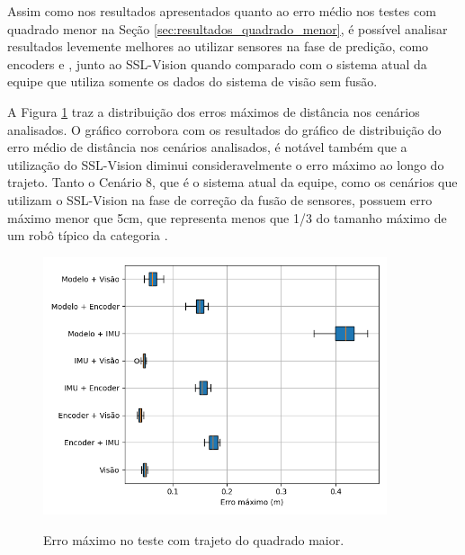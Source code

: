 \documentclass[acronym, symbols, table]{fei}
\begin{document}
		Assim como nos resultados apresentados quanto ao erro médio nos testes com quadrado menor na Seção \ref{sec:resultados_quadrado_menor}, é possível analisar resultados levemente melhores ao utilizar sensores na fase de predição, como encoders e , junto ao SSL-Vision quando comparado com o sistema atual da equipe que utiliza somente os dados do sistema de visão sem fusão.
	
		A Figura \ref{fig:erro_maximo_distancia_quad_maior} traz a distribuição dos erros máximos de distância nos cenários analisados. O gráfico corrobora com os resultados do gráfico de distribuição do erro médio de distância nos cenários analisados, é notável também que a utilização do SSL-Vision diminui consideravelmente o erro máximo ao longo do trajeto. Tanto o Cenário 8, que é o sistema atual da equipe, como os cenários que utilizam o SSL-Vision na fase de correção da fusão de sensores, possuem erro máximo menor que 5cm, que representa menos que 1/3 do tamanho máximo de um robô típico da categoria . %
		
		\begin{figure}[!htb]
			\centering
			\caption{Erro máximo no teste com trajeto do quadrado maior.}
			\includegraphics[width=0.9\textwidth]{../Dados/Graficos-Resultados/erro_maximo_distancia_quadrado_maior.png}
			\label{fig:erro_maximo_distancia_quad_maior}
		\end{figure}
	
\end{document}
